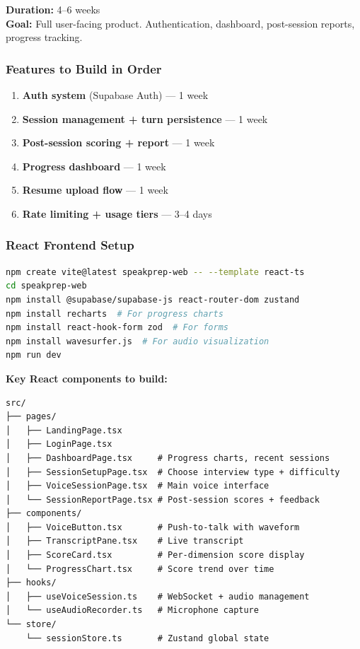 \documentclass[
  11pt,
]{article}
\providecommand{\tightlist}{%
  \setlength{\itemsep}{0pt}\setlength{\parskip}{0pt}}
\begin{document}
\textbf{Duration:} 4--6 weeks\\
\textbf{Goal:} Full user-facing product. Authentication, dashboard,
post-session reports, progress tracking.

\hypertarget{features-to-build-in-order}{%
\subsubsection{Features to Build in
Order}\label{features-to-build-in-order}}

\begin{enumerate}
\def\labelenumi{\arabic{enumi}.}
\tightlist
\item
  \textbf{Auth system} (Supabase Auth) --- 1 week
\item
  \textbf{Session management + turn persistence} --- 1 week
\item
  \textbf{Post-session scoring + report} --- 1 week
\item
  \textbf{Progress dashboard} --- 1 week
\item
  \textbf{Resume upload flow} --- 1 week
\item
  \textbf{Rate limiting + usage tiers} --- 3--4 days
\end{enumerate}

\hypertarget{react-frontend-setup}{%
\subsubsection{React Frontend Setup}\label{react-frontend-setup}}

\begin{lstlisting}[language=bash]
npm create vite@latest speakprep-web -- --template react-ts
cd speakprep-web
npm install @supabase/supabase-js react-router-dom zustand
npm install recharts  # For progress charts
npm install react-hook-form zod  # For forms
npm install wavesurfer.js  # For audio visualization
npm run dev
\end{lstlisting}

\textbf{Key React components to build:}

\begin{lstlisting}
src/
├── pages/
│   ├── LandingPage.tsx
│   ├── LoginPage.tsx
│   ├── DashboardPage.tsx     # Progress charts, recent sessions
│   ├── SessionSetupPage.tsx  # Choose interview type + difficulty
│   ├── VoiceSessionPage.tsx  # Main voice interface
│   └── SessionReportPage.tsx # Post-session scores + feedback
├── components/
│   ├── VoiceButton.tsx       # Push-to-talk with waveform
│   ├── TranscriptPane.tsx    # Live transcript
│   ├── ScoreCard.tsx         # Per-dimension score display
│   └── ProgressChart.tsx     # Score trend over time
├── hooks/
│   ├── useVoiceSession.ts    # WebSocket + audio management
│   └── useAudioRecorder.ts   # Microphone capture
└── store/
    └── sessionStore.ts       # Zustand global state
\end{lstlisting}
\end{document}
